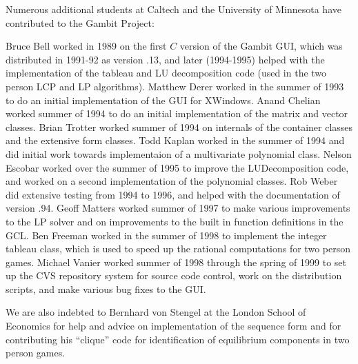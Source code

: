 \documentclass[12pt]{report}
\begin{document}
Numerous additional students at Caltech and the University of Minnesota
have contributed to the Gambit Project:

Bruce Bell worked in 1989 on the first $C$ version of the Gambit GUI,
which was distributed in 1991-92 as version .13, and later (1994-1995)
helped with the implementation of the tableau and LU decomposition
code (used in the two person LCP and LP algorithms). Matthew Derer
worked in the summer of 1993 to do an initial implementation of the
GUI for XWindows.  Anand Chelian worked summer of 1994 to do an
initial implementation of the matrix and vector classes.  Brian
Trotter worked summer of 1994 on internals of the container classes
and the extensive form classes.  Todd Kaplan worked in the summer of
1994 and did initial work towards implementaion of a multivariate
polynomial class.  Nelson Escobar worked over the summer of 1995 to
improve the LUDecomposition code, and worked on a second
implementation of the polynomial classes.  Rob Weber did extensive
testing from 1994 to 1996, and helped with the documentation of
version .94.  Geoff Matters worked summer of 1997 to make various
improvements to the LP solver and on improvements to the built in
function definitions in the GCL.  Ben Freeman worked in the summer of
1998 to implement the integer tableau class, which is used to speed up
the rational computations for two person games.  Michael Vanier worked
summer of 1998 through the spring of 1999 to set up the CVS repository
system for source code control, work on the distribution scripts, and
make various bug fixes to the GUI.

We are also indebted to Bernhard von Stengel at the London School of
Economics for help and advice on implementation of the sequence form
and for contributing his ``clique'' code for identification of
equilibrium components in two person games.













\helpignore{}
\end{document}
